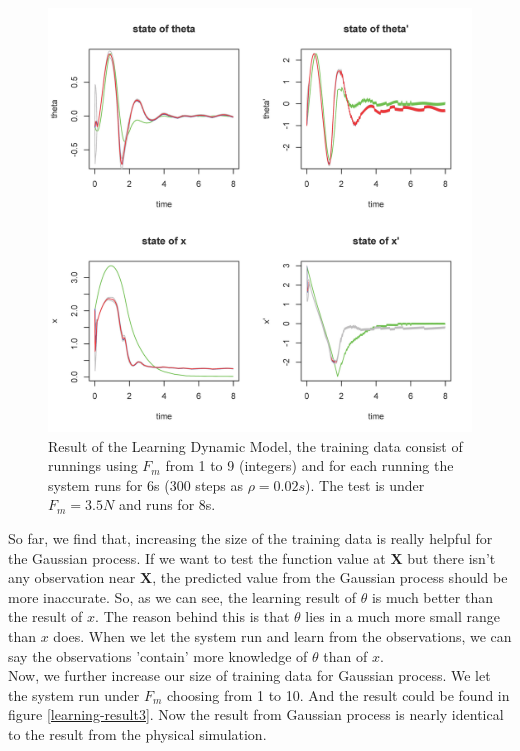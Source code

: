 \documentclass[11pt,twoside,a4paper]{article}
\begin{document}
\begin{figure}[!]
\centering
\includegraphics[width=14cm]{learning-result2.png}
\caption{Result of the Learning Dynamic Model, the training data
  consist of runnings using $F_m$ from 1 to 9 (integers) and for each
  running the system runs for 6s (300 steps as $\rho = 0.02s$). The
  test is under $F_m = 3.5N$ and runs for 8s.}
\label{learning-result2}
\end{figure}

So far, we find that, increasing the size of the training data is
really helpful for the Gaussian process. If we want to test the
function value at $\textbf{X}$ but there isn't any observation near
$\textbf{X}$, the predicted value from the Gaussian process should be
more inaccurate. So, as we can see, the learning result of $\theta$ is
much better than the result of $x$. The reason behind this is that
$\theta$ lies in a much more small range than $x$ does. When we let
the system run and learn from the observations, we can say the
observations 'contain' more knowledge of $\theta$ than of $x$.\\

Now, we further increase our size of training data for Gaussian
process. We let the system run under $F_m$ choosing from 1 to 10. And
the result could be found in figure \ref{learning-result3}. Now the
result from Gaussian process is nearly identical to the result from
the physical simulation.\\
\end{document}
